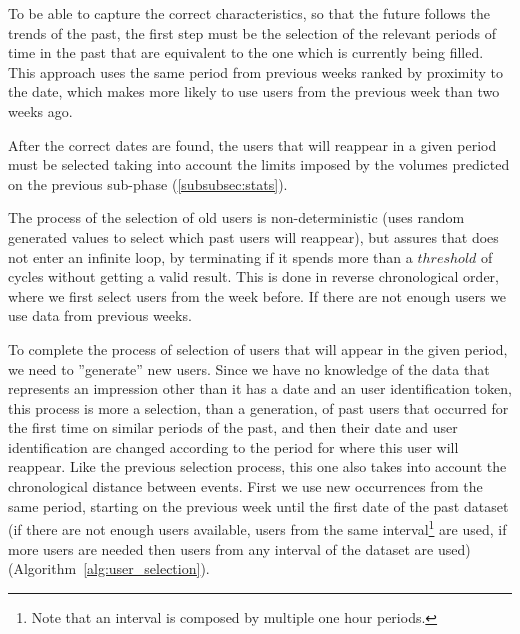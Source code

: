 To be able to capture the correct characteristics, so that the future follows the
trends of the past, the first step must be the selection of the relevant periods of
time in the past that are equivalent to the one which is currently being filled.
This approach uses the same period from previous weeks ranked by proximity to
the date, which makes more likely to use users from the previous week than two
weeks ago.

After the correct dates are found, the users that will reappear in a given
period must be selected taking into account the limits imposed by the volumes
predicted on the previous sub-phase (\ref{subsubsec:stats}).

The process of the selection of old users is non-deterministic (uses random generated
values to select which past users will reappear), but assures that does not enter
an infinite loop, by terminating if it spends more than a $threshold$ of cycles
without getting a valid result. This is done in reverse chronological order,
where we first select users from the week before. If there are not enough
users we use data from previous weeks.

To complete the process of selection of users that will appear in the given
period, we need to ''generate'' new users. Since we have no knowledge of the
data that represents an impression other than it has a date and an user
identification token, this process is more a selection, than a generation, of
past users that occurred for the first time on similar periods of the past, and
then their date and user identification are changed according to the period for
where this user will reappear. Like the previous selection process, this one also
takes into account the chronological distance between events. First we use new
occurrences from the same period, starting on the previous week until the first date
of the past dataset (if there are not enough users available, users from the
same interval\footnote{Note that an interval is composed by multiple one hour
periods.} are used, if more users are needed then users from any interval of the
dataset are used)(Algorithm~\ref{alg:user_selection}).
\\

